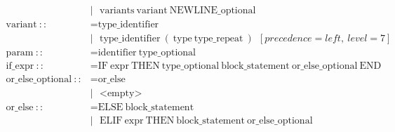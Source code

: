 \documentclass{article}
\begin{document}
\begin{align*}
                                      & |\ \ \ \text{variants}\ \text{variant}\ \text{NEWLINE\_optional}                                                                                                                                                          \\
  \text{variant}\ ::                  & = \text{type\_identifier}                                                                                                                                                                                                 \\
                                      & |\ \ \ \text{type\_identifier}\ (\ \text{type}\ \text{type\_repeat}\ )\ \ [precedence=left,\ level=7]                                                                                                                     \\
  \text{param}\ ::                    & = \text{identifier}\ \text{type\_optional}                                                                                                                                                                                \\
  \text{if\_expr}\ ::                 & = \text{IF}\ \text{expr}\ \text{THEN}\ \text{type\_optional}\ \text{block\_statement}\ \text{or\_else\_optional}\ \text{END}                                                                                              \\
  \text{or\_else\_optional}\ ::       & = \text{or\_else}                                                                                                                                                                                                         \\
                                      & |\ \ \ \text{<empty>}                                                                                                                                                                                                     \\
  \text{or\_else}\ ::                 & = \text{ELSE}\ \text{block\_statement}                                                                                                                                                                                    \\
                                      & |\ \ \ \text{ELIF}\ \text{expr}\ \text{THEN}\ \text{block\_statement}\ \text{or\_else\_optional}                                                                                                                          \\

\end{align*}
\end{document}
